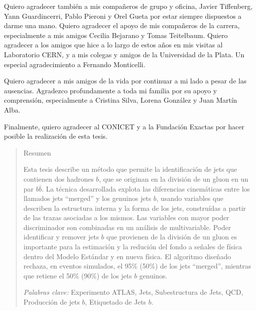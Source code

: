 \documentclass[11pt,a4paper,12pt]{report}
\begin{document}
Quiero agradecer tambi\'en a mis  compa\~neros de grupo y oficina, Javier Tiffenberg, Yann Guardincerri, Pablo Pieroni y Orel Gueta por estar siempre dispuestos a darme una mano. Quiero agradecer el apoyo de mis compa\~neros de la carrera, especialmente a mis amigos Cecilia Bejarano y Tomas Teitelbaum. Quiero agradecer a los amigos que hice a lo largo de estos a\~nos en mis visitas al Laboratorio CERN, y a mis colegas y amigos de la Universidad de la Plata. Un especial agradecimiento a Fernando Monticelli.

Quiero agradecer a mis amigos de la vida por continuar a mi lado a pesar de las ausencias. Agradezco profundamente a toda mi familia por su apoyo y comprensi\'on, especialmente a Cristina Silva, Lorena Gonz\'alez y Juan Mart\'in Alba.

Finalmente, quiero agradecer al CONICET y a la Fundaci\'on Exactas por hacer posible la realizaci\'on de esta tesis.




\renewcommand{\abstractname}{Identificaci\'on de jets con dos hadrones \emph{\textbf{b}} producidos por desdoblamiento de gluones con el detector ATLAS.}
\begin{abstract}

\vspace{1.5cm}
\begin{center}
  Resumen
\end{center}

Esta tesis describe un m\'etodo que permite la identificaci\'on de jets que contienen dos hadrones $b$, que se originan en la divisi\'on de un gluon en un par $b\bar{b}$. 
La t\'ecnica desarrollada explota las diferencias cinem\'aticas entre los llamados jets ``merged'' y los genuinos jets $b$, usando variables que describen la estructura interna y la forma de los jets, constru\'idas a partir de las trazas asociadas a los mismos. Las variables con mayor poder discriminador son combinadas en un an\'alisis de multivariable.
Poder identificar y remover jets $b$ que provienen de la divisi\'on de un gluon es importante para la estimaci\'on y la reduci\'on del fondo a se\~nales de f\'isica dentro del Modelo Est\'andar y en nueva f\'isica.
El algoritmo dise\~nado rechaza, en eventos simulados, el 95\% (50\%) de los jets ``merged'', mientras que retiene el 50\% (90\%) de los jets $b$ genuinos.


\vspace{1.5cm}
\emph{Palabras clave:} Experimento ATLAS, Jets, Subestructura de Jets, QCD, Producci\'on de jets $b$,  Etiquetado de Jets $b$.
\end{abstract}
\end{document}
